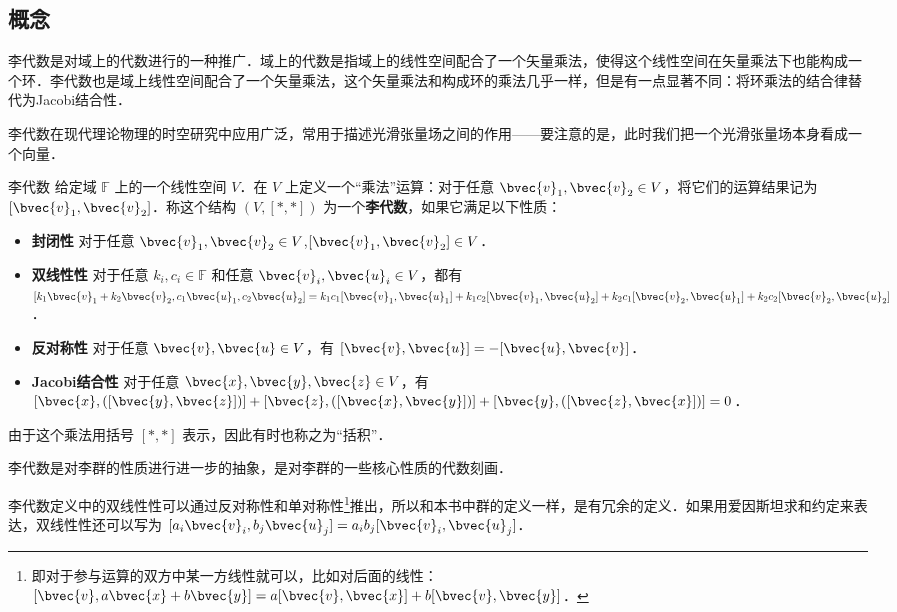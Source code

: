 

\subsection{概念}

李代数是对域上的代数进行的一种推广．域上的代数是指域上的线性空间配合了一个矢量乘法，使得这个线性空间在矢量乘法下也能构成一个环．李代数也是域上线性空间配合了一个矢量乘法，这个矢量乘法和构成环的乘法几乎一样，但是有一点显著不同：将环乘法的结合律替代为Jacobi结合性．

李代数在现代理论物理的时空研究中应用广泛，常用于描述光滑张量场之间的作用——要注意的是，此时我们把一个光滑张量场本身看成一个向量．

\begin{definition}{李代数}
给定域 $\mathbb{F}$ 上的一个线性空间 $V$．在 $V$ 上定义一个“乘法”运算：对于任意 $\bvec{v}_1, \bvec{v}_2\in V$，将它们的运算结果记为 $[\bvec{v}_1, \bvec{v}_2]$．称这个结构 $(V, [*, *])$ 为一个\textbf{李代数}，如果它满足以下性质：
\begin{itemize}
\item \textbf{封闭性} 对于任意 $\bvec{v}_1, \bvec{v}_2\in V$,$[\bvec{v}_1, \bvec{v}_2]\in V$．
\item \textbf{双线性性} 对于任意 $k_i, c_i\in \mathbb{F}$ 和任意 $\bvec{v}_i, \bvec{u}_i\in V$，都有 $[k_1\bvec{v}_1+k_2\bvec{v}_2, c_1\bvec{u}_1, c_2\bvec{u}_2]=k_1c_1[\bvec{v}_1, \bvec{u}_1]+k_1c_2[\bvec{v}_1, \bvec{u}_2]+k_2c_1[\bvec{v}_2, \bvec{u}_1]+k_2c_2[\bvec{v}_2, \bvec{u}_2]$．
\item \textbf{反对称性} 对于任意 $\bvec{v}, \bvec{u}\in V$，有 $[\bvec{v}, \bvec{u}]=-[\bvec{u}, \bvec{v}]$．
\item \textbf{Jacobi结合性} 对于任意 $\bvec{x}, \bvec{y}, \bvec{z}\in V$，有 $[\bvec{x}, ([\bvec{y}, \bvec{z}])]+[\bvec{z}, ([\bvec{x}, \bvec{y}])]+[\bvec{y}, ([\bvec{z}, \bvec{x}])]=0$．
\end{itemize}

由于这个乘法用括号 $[*, *]$ 表示，因此有时也称之为“括积”．
\end{definition}

李代数是对李群的性质进行进一步的抽象，是对李群的一些核心性质的代数刻画．

李代数定义中的双线性性可以通过反对称性和单对称性\footnote{即对于参与运算的双方中某一方线性就可以，比如对后面的线性：$[\bvec{v},a\bvec{x}+b\bvec{y}]=a[\bvec{v}, \bvec{x}]+b[\bvec{v}, \bvec{y}]$．}推出，所以和本书中群的定义一样，是有冗余的定义．如果用爱因斯坦求和约定来表达，双线性性还可以写为 $[a_i\bvec{v}_i, b_j\bvec{u}_j]=a_ib_j[\bvec{v}_i, \bvec{u}_j]$．

